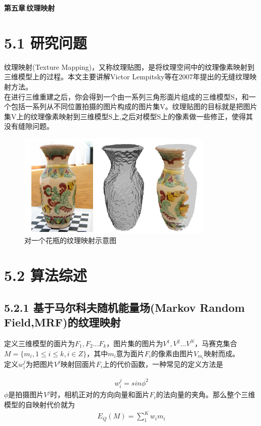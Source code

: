 \documentclass[11pt,a4,notitlepage]{article}
\begin{document}
\begin{CJK}{UTF8}{gkai}

\renewcommand\refname{参考文献}

\begin{center}{\bf \LARGE 第五章\,纹理映射}\end{center}

\section*{5.1 研究问题}
纹理映射(Texture Mapping)，又称纹理贴图，是将纹理空间中的纹理像素映射到三维模型上的过程。本文主要讲解Victor Lempitsky等在2007年提出的无缝纹理映射方法。\cite{name1}\\
在进行三维重建之后，你会得到一个由一系列三角形面片组成的三维模型S，和一个包括一系列从不同位置拍摄的图片构成的图片集V。纹理贴图的目标就是把图片集V上的纹理像素映射到三维模型S上,之后对模型S上的像素做一些修正，使得其没有缝隙问题。
\begin{figure}[h]
	\centering
	\includegraphics{introduction.png}
	\caption{对一个花瓶的纹理映射示意图}
\end{figure}
\section*{5.2 算法综述}
\subsection*{5.2.1 基于马尔科夫随机能量场(Markov Random Field,MRF)的纹理映射}
定义三维模型的面片为$F_{1},F_{2}...F_{k}$，图片集的图片为$V^{1},V^{2}...V^{N}$，马赛克集合$M=\{m_{i},1\leq i\leq k,i \in Z\}$，其中$m_{i}$意为面片$F_{i}$的像素由图片$V_{m_{i}}$映射而成。\\
定义$w_{i}^{j}$为把图片$V^{j}$映射回面片$F_{i}$上的代价函数，一种常见的定义方法是

\begin{align} w_{i}^{j} = sin\phi^{2}	\end{align} $\phi$是拍摄图片$V^{j}$时，相机正对的方向向量和面片$F_{i}$的法向量的夹角。那么整个三维模型的自映射代价就为
\begin{align} E_{Q}(M) = \sum_{1}^{K} w_{i}{m_{i}}	\end{align}


\end{CJK}
\end{document}
